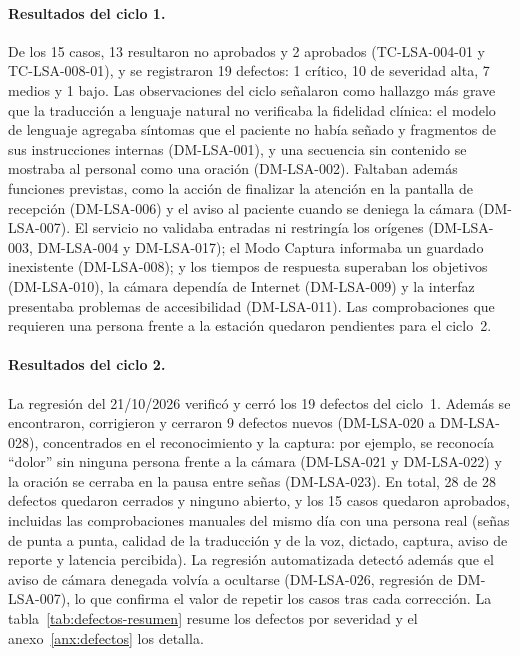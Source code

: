 \paragraph{Resultados del ciclo 1.} De los 15 casos, 13 resultaron no aprobados y 2 aprobados (TC-LSA-004-01 y TC-LSA-008-01), y se registraron 19 defectos: 1 crítico, 10 de severidad alta, 7 medios y 1 bajo. Las observaciones del ciclo señalaron como hallazgo más grave que la traducción a lenguaje natural no verificaba la fidelidad clínica: el modelo de lenguaje agregaba síntomas que el paciente no había señado y fragmentos de sus instrucciones internas (DM-LSA-001), y una secuencia sin contenido se mostraba al personal como una oración (DM-LSA-002). Faltaban además funciones previstas, como la acción de finalizar la atención en la pantalla de recepción (DM-LSA-006) y el aviso al paciente cuando se deniega la cámara (DM-LSA-007). El servicio no validaba entradas ni restringía los orígenes (DM-LSA-003, DM-LSA-004 y DM-LSA-017); el Modo Captura informaba un guardado inexistente (DM-LSA-008); y los tiempos de respuesta superaban los objetivos (DM-LSA-010), la cámara dependía de Internet (DM-LSA-009) y la interfaz presentaba problemas de accesibilidad (DM-LSA-011). Las comprobaciones que requieren una persona frente a la estación quedaron pendientes para el ciclo~2.

\paragraph{Resultados del ciclo 2.} La regresión del 21/10/2026 verificó y cerró los 19 defectos del ciclo~1. Además se encontraron, corrigieron y cerraron 9 defectos nuevos (DM-LSA-020 a DM-LSA-028), concentrados en el reconocimiento y la captura: por ejemplo, se reconocía ``dolor'' sin ninguna persona frente a la cámara (DM-LSA-021 y DM-LSA-022) y la oración se cerraba en la pausa entre señas (DM-LSA-023). En total, 28 de 28 defectos quedaron cerrados y ninguno abierto, y los 15 casos quedaron aprobados, incluidas las comprobaciones manuales del mismo día con una persona real (señas de punta a punta, calidad de la traducción y de la voz, dictado, captura, aviso de reporte y latencia percibida). La regresión automatizada detectó además que el aviso de cámara denegada volvía a ocultarse (DM-LSA-026, regresión de DM-LSA-007), lo que confirma el valor de repetir los casos tras cada corrección. La tabla~\ref{tab:defectos-resumen} resume los defectos por severidad y el anexo~\ref{anx:defectos} los detalla.

